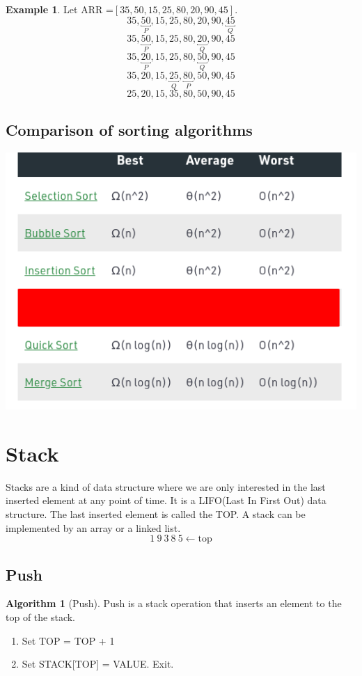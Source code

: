 \documentclass[10pt, a4paper]{extarticle}
\theoremstyle{definition}
\newtheorem{alg}{Algorithm}
\newtheorem{eg}{Example}
\begin{document}
\begin{eg}
	Let ARR =$[35,50,15,25,80,20,90,45]$.
	\[\boxed{35},\underbracket{50}_P,15,25,80,20,90,\underbracket{45}_Q\]
	\[\boxed{35},\underbracket{50}_P,15,25,80,\underbracket{20}_Q,90,45\]
	\[\boxed{35},\underbracket{20}_P,15,25,80,\underbracket{50}_Q,90,45\]
	\[\boxed{35},20,15,\underbracket{25}_Q,\underbracket{80}_P,50,90,45\]
	\[25,20,15,\boxed{35},80,50,90,45\]
\end{eg}

\subsection{Comparison of sorting algorithms}
\begin{center}
	\includegraphics[scale=0.7]{sort.png}\\
\end{center}


\section{Stack}
Stacks are a kind of data structure where we are only interested in the last inserted element at any point of time. It is a LIFO(Last In First Out) data structure. The last inserted element is called the TOP. A stack can be implemented by an array or a linked list.
\[1\ 9\ 3\ 8\ 5\leftarrow\boxed{\text{top}}\]
\subsection{Push}
\begin{alg}[Push]
	Push is a stack operation that inserts an element to the top of the stack.
	\begin{enumerate}
		\item Set TOP = TOP + 1
		\item Set STACK[TOP] = VALUE. Exit.
	\end{enumerate}
\end{alg}
\end{document}
